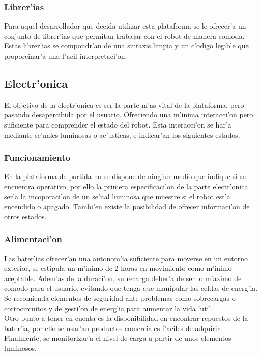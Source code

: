 \documentclass[twoside,12pt]{article}
\begin{document}
\subsubsection{Librer'ias}
Para aquel desarrollador que decida utilizar esta plataforma se le ofrecer'a un conjunto de librer'ias que permitan trabajar con el robot de manera comoda. Estas librer'ias se compondr'an de una sintaxis limpia y un c'odigo legible que proporcinar'a una f'acil interpretaci'on.    

\subsection{Electr'onica}
El objetivo de la electr'onica es ser la parte m'as vital de la plataforma, pero pasando desapercibida por el usuario. Ofreciendo una m'inima interacci'on pero suficiente para comprender el estado del robot. Esta interacci'on se har'a mediante se'nales luminosas o ac'usticas, e indicar'an los siguientes estados.

\subsubsection{Funcionamiento}
En la plataforma de partida no se dispone de ning'un medio que indique si se encuentra operativo, por ello la primera especificaci'on de la parte electr'onica ser'a la incoporaci'on de un se'nal luminosa que muestre si el robot est'a encendido o apagado. Tambi'en existe la posibilidad de ofrecer informaci'on de otros estados.

\subsubsection{Alimentaci'on}
Las bater'ias ofrecer'an  una autonom'ia suficiente para moverse en un entorno exterior, se estipula un m'inimo de 2 horas en movimiento como m'inimo aceptable. Adem'as de la duraci'on, su recarga deber'a de ser lo m'aximo de comodo para el usuario, evitando que tenga que manipular las celdas de energ'ia. Se recomienda elementos de seguridad ante problemas como sobrecargas o cortocircuitos y de gesti'on de energ'ia para aumentar la vida 'util.\\

Otro punto a tener en cuenta es la disponibilidad en encontrar repuestos de la bater'ia, por ello se usar'an productos comerciales f'aciles de adquirir. Finalmente, se monitorizar'a el nivel de carga a partir de unos elementos luminosos.
\end{document}
